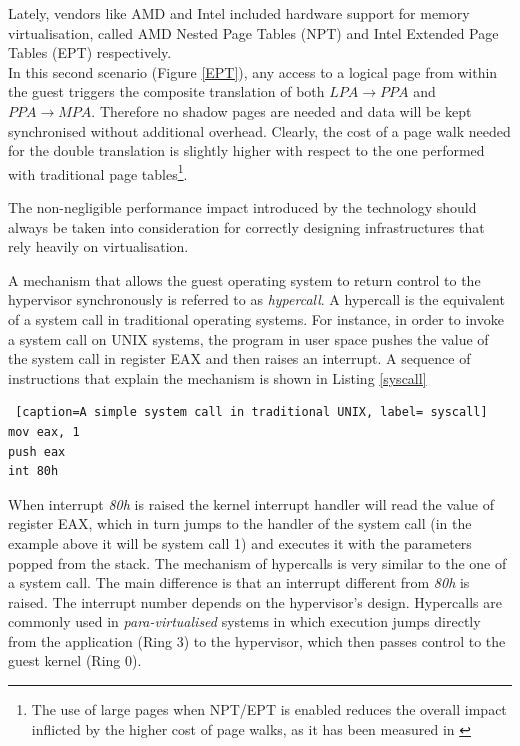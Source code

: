 Lately, vendors like AMD and Intel included hardware support for memory virtualisation, called AMD Nested Page Tables (NPT) and Intel Extended Page Tables (EPT)  respectively.\\ %
In this second scenario (Figure \ref{EPT}), any access to a logical page from within the guest triggers the composite translation of both $LPA \rightarrow PPA$ and $PPA \rightarrow MPA$. Therefore no shadow pages are needed and data will be kept synchronised without additional overhead. Clearly, the cost of a page walk needed for the double translation is slightly higher with respect to the one performed with traditional page tables\footnote{The use of large pages when NPT/EPT is enabled reduces the overall impact inflicted by the higher cost of page walks, as it has been measured in \cite{perfEPT, perfESX} }.  


The non-negligible performance impact introduced by the technology should always be taken into consideration for correctly designing infrastructures that rely heavily on virtualisation.%

A mechanism that allows the guest operating system to return control to the hypervisor synchronously is referred to as \emph{hypercall}. A hypercall is the equivalent of a system call in traditional operating systems. 
For instance, in order to invoke a system call on UNIX systems, the program in user space pushes the value of the system call in register EAX and then raises an interrupt. A sequence of instructions that explain the mechanism is shown in Listing \ref{syscall}

\begin{lstlisting} [caption=A simple system call in traditional UNIX, label= syscall]
mov eax, 1
push eax
int 80h
\end{lstlisting}

When interrupt \emph{80h} is raised the kernel interrupt handler will read the value of register EAX, which in turn jumps to the handler of the system call (in the example above it will be system call 1) and executes it with the parameters popped from the stack.
The mechanism of hypercalls is very similar to the one of a system call. The main difference is that an interrupt different from \emph{80h} is raised. The interrupt number depends on the hypervisor's design.
Hypercalls are commonly used in \emph{para-virtualised} systems in which execution jumps directly from the application (Ring 3) to the hypervisor, which then passes control to the guest kernel (Ring 0). 


